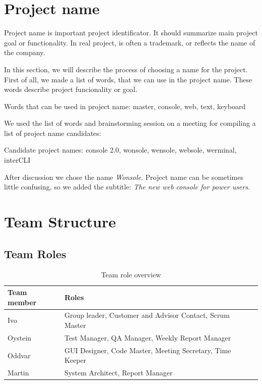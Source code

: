 \section{Project name}
Project name is important project identificator. It should summarize main project goal or functionality. In real project, is often a trademark, or reflects the name of the company.

In this section, we will describe the process of choosing a name for the project. First of all, we made a list of words, that we can use in the project name. These words describe project funcionality or goal.

Words that can be used in project name: master, console, web, text, keyboard

We used the list of words and brainstorming session on a meeting for compiling a list of project name candidates:

Candidate project names: console 2.0, wonsole, wensole, websole, werminal, interCLI

After discussion we chose the name \emph{Wonsole}. Project name can be sometimes little confusing, so we added the subtitle: \emph{The new web console for power users.}


\section{Team Structure}

\subsection{Team Roles}
\begin{table}
\begin{tabularx}{\textwidth}{ | l | X | l | }
  \hline
  \textbf{Team member} & \textbf{Roles} \\ \hline
  Ivo & Group leader, Customer and Advisor Contact, Scrum Master \\ \hline
  Oystein & Test Manager, QA Manager, Weekly Report Manager \\ \hline
  Oddvar & GUI Designer, Code Master, Meeting Secretary, Time Keeper \\ \hline
  Martin & System Architect, Report Manager \\ \hline
\end{tabularx}
\caption{Team role overview}
\end{table}



